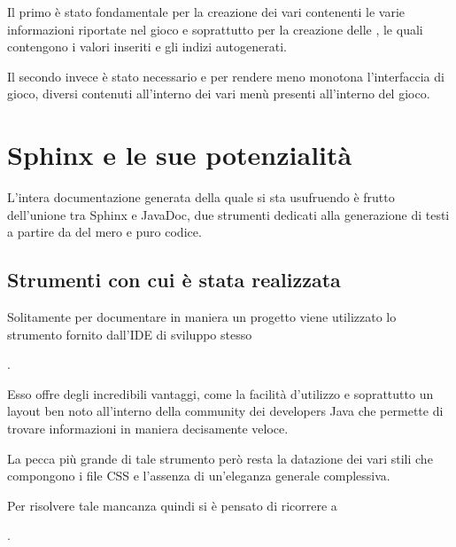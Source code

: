\documentclass[letterpaper,10pt,italian,openany,oneside]{sphinxmanual}
\begin{document}
Il primo è stato fondamentale per la creazione dei vari  contenenti le varie informazioni riportate nel gioco e soprattutto per la creazione delle , le quali contengono i valori inseriti e gli indizi autogenerati.

Il secondo invece è stato necessario  e per rendere meno monotona l’interfaccia di gioco,  diversi contenuti all’interno dei vari menù presenti all’interno del gioco.


\chapter{Sphinx e le sue potenzialità}
\label{\detokenize{sphinx:sphinx-e-le-sue-potenzialita}}\label{\detokenize{sphinx::doc}}
L’intera documentazione generata della quale si sta usufruendo è frutto dell’unione tra Sphinx e JavaDoc, due strumenti
dedicati alla generazione di testi a partire da del mero e puro codice.


\section{Strumenti con cui è stata realizzata}
\label{\detokenize{sphinx:strumenti-con-cui-e-stata-realizzata}}
Solitamente per documentare in maniera  un progetto  viene utilizzato
lo strumento fornito dall’IDE di sviluppo stesso  %
\begin{footnote}[1]\sphinxAtStartFootnote
{}
%
\end{footnote}.

Esso offre degli incredibili vantaggi, come la facilità d’utilizzo e soprattutto un
layout ben noto all’interno della community dei developers Java che permette
di trovare informazioni in maniera decisamente veloce.

La pecca più grande di tale strumento però resta la datazione dei vari stili che compongono
i file CSS e l’assenza di un’eleganza generale complessiva.

Per risolvere tale mancanza quindi si è pensato di ricorrere a  %
\begin{footnote}[2]\sphinxAtStartFootnote
{}
%
\end{footnote}.
\end{document}
